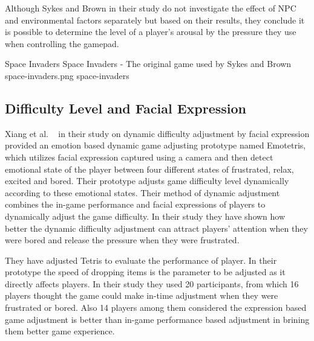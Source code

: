 Although Sykes and Brown in their study do not investigate the effect of NPC and environmental factors separately but based on their results, they conclude it is possible to determine the level of a player's arousal by the pressure they use when controlling the gamepad.

\img
{Space Invaders}
{Space Invaders - The original game used by Sykes and Brown}
{space-invaders.png}
{space-invaders}

\subsection{Difficulty Level and Facial Expression}
Xiang et al. ~\cite{xiang2013dynamic} in their study on dynamic difficulty adjustment by facial expression provided an emotion based dynamic game adjusting prototype named Emotetris, which utilizes facial expression captured using a camera and then detect emotional state of the player between four different states of frustrated, relax, excited and bored. Their prototype adjusts game difficulty level dynamically according to these emotional states. Their method of dynamic adjustment combines the in-game performance and facial expressions of players to dynamically adjust the game difficulty. In their study they have shown how better the dynamic difficulty adjustment can attract players' attention when they were bored and release the pressure when they were frustrated.

They have adjusted Tetris to evaluate the performance of player. In their prototype the speed of dropping items is the parameter to be adjusted as it directly affects players. In their study they used 20 participants, from which 16 players thought the game could make in-time adjustment when they were frustrated or bored. Also 14 players among them considered the expression based game adjustment is better than in-game performance based adjustment in brining them better game experience.


